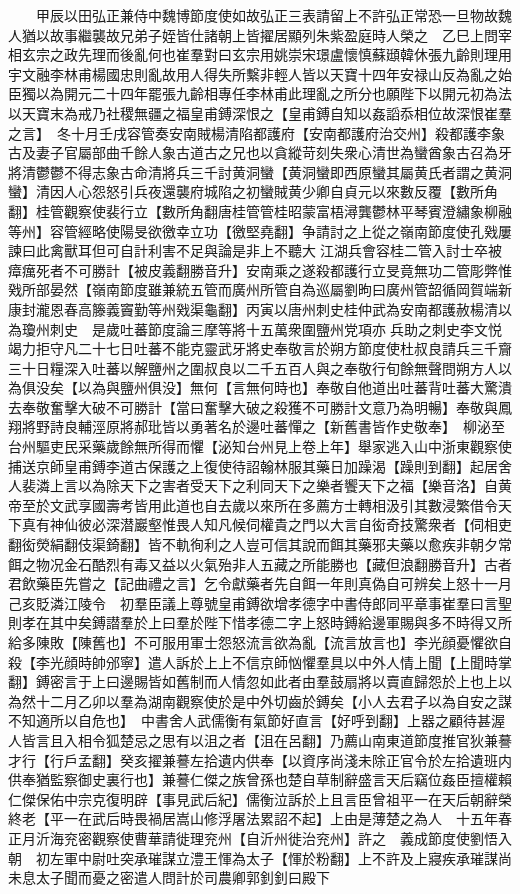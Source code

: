 　　甲辰以田弘正兼侍中魏博節度使如故弘正三表請留上不許弘正常恐一旦物故魏人猶以故事繼襲故兄弟子姪皆仕諸朝上皆擢居顯列朱紫盈庭時人榮之　乙巳上問宰相玄宗之政先理而後亂何也崔羣對曰玄宗用姚崇宋璟盧懷慎蘇頲韓休張九齡則理用宇文融李林甫楊國忠則亂故用人得失所繫非輕人皆以天寶十四年安禄山反為亂之始臣獨以為開元二十四年罷張九齡相專任李林甫此理亂之所分也願陛下以開元初為法以天寶末為戒乃社稷無疆之福皇甫鎛深恨之【皇甫鎛自知以姦謟忝相位故深恨崔羣之言】　冬十月壬戌容管奏安南賊楊清陷都護府【安南都護府治交州】殺都護李象古及妻子官屬部曲千餘人象古道古之兄也以貪縱苛刻失衆心清世為蠻酋象古召為牙將清鬱鬱不得志象古命清將兵三千討黄洞蠻【黄洞蠻即西原蠻其屬黄氏者謂之黄洞蠻】清因人心怨怒引兵夜還襲府城陷之初蠻賊黄少卿自貞元以來數反覆【數所角翻】桂管觀察使裴行立【數所角翻唐桂管管桂昭蒙富梧潯龔鬱林平琴賓澄繡象柳融等州】容管經略使陽旻欲徼幸立功【徼堅堯翻】争請討之上從之嶺南節度使孔戣屢諫曰此禽獸耳但可自計利害不足與論是非上不聽大江湖兵會容桂二管入討士卒被瘴癘死者不可勝計【被皮義翻勝音升】安南乘之遂殺都護行立旻竟無功二管彫弊惟戣所部晏然【嶺南節度雖兼統五管而廣州所管自為巡屬劉昫曰廣州管韶循岡賀端新康封瀧恩春高籐義竇勤等州戣渠龜翻】丙寅以唐州刺史桂仲武為安南都護赦楊清以為瓊州刺史　是歲吐蕃節度論三摩等將十五萬衆圍鹽州党項亦兵助之刺史李文悦竭力拒守凡二十七日吐蕃不能克靈武牙將史奉敬言於朔方節度使杜叔良請兵三千齎三十日糧深入吐蕃以解鹽州之圍叔良以二千五百人與之奉敬行旬餘無聲問朔方人以為俱没矣【以為與鹽州俱没】無何【言無何時也】奉敬自他道出吐蕃背吐蕃大驚潰去奉敬奮擊大破不可勝計【當曰奮擊大破之殺獲不可勝計文意乃為明暢】奉敬與鳳翔將野詩良輔涇原將郝玭皆以勇著名於邊吐蕃憚之【新舊書皆作史敬奉】　柳泌至台州驅吏民采藥歲餘無所得而懼【泌知台州見上卷上年】舉家逃入山中浙東觀察使捕送京師皇甫鎛李道古保護之上復使待詔翰林服其藥日加躁渴【躁則到翻】起居舍人裴潾上言以為除天下之害者受天下之利同天下之樂者饗天下之福【樂音洛】自黄帝至於文武享國壽考皆用此道也自去歲以來所在多薦方士轉相汲引其數浸繁借令天下真有神仙彼必深潜巖壑惟畏人知凡候伺權貴之門以大言自衒奇技驚衆者【伺相吏翻衒熒絹翻伎渠錡翻】皆不軌徇利之人豈可信其說而餌其藥邪夫藥以愈疾非朝夕常餌之物况金石酷烈有毒又益以火氣殆非人五藏之所能勝也【藏但浪翻勝音升】古者君飲藥臣先嘗之【記曲禮之言】乞令獻藥者先自餌一年則真偽自可辨矣上怒十一月己亥貶潾江陵令　初羣臣議上尊號皇甫鎛欲增孝德字中書侍郎同平章事崔羣曰言聖則孝在其中矣鎛譛羣於上曰羣於陛下惜孝德二字上怒時鎛給邊軍賜與多不時得又所給多陳敗【陳舊也】不可服用軍士怨怒流言欲為亂【流言放言也】李光顔憂懼欲自殺【李光顔時帥邠寧】遣人訴於上上不信京師忷懼羣具以中外人情上聞【上聞時掌翻】鎛密言于上曰邊賜皆如舊制而人情忽如此者由羣鼓扇將以賣直歸怨於上也上以為然十二月乙卯以羣為湖南觀察使於是中外切齒於鎛矣【小人去君子以為自安之謀不知適所以自危也】　中書舍人武儒衡有氣節好直言【好呼到翻】上器之顧待甚渥人皆言且入相令狐楚忌之思有以沮之者【沮在呂翻】乃薦山南東道節度推官狄兼謩才行【行戶孟翻】癸亥擢兼謩左拾遺内供奉【以資序尚淺未除正官令於左拾遺班内供奉猶監察御史裏行也】兼謩仁傑之族曾孫也楚自草制辭盛言天后竊位姦臣擅權賴仁傑保佑中宗克復明辟【事見武后紀】儒衡泣訴於上且言臣曾祖平一在天后朝辭榮終老【平一在武后時畏禍居嵩山修浮屠法累詔不起】上由是薄楚之為人　十五年春正月沂海兖密觀察使曹華請徙理兖州【自沂州徙治兖州】許之　義成節度使劉悟入朝　初左軍中尉吐突承璀謀立澧王惲為太子【惲於粉翻】上不許及上寢疾承璀謀尚未息太子聞而憂之密遣人問計於司農卿郭釗釗曰殿下